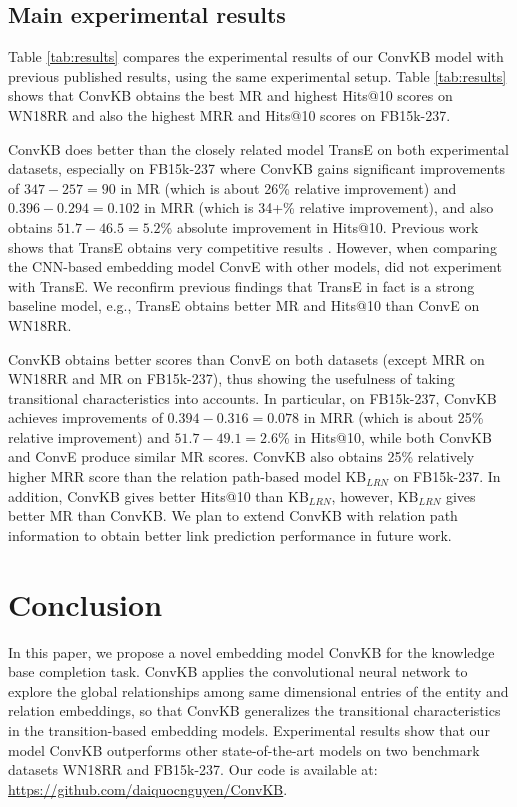 \documentclass[11pt,a4paper]{article}
\begin{document}
\subsection{Main experimental results}
Table \ref{tab:results} compares the experimental results of our ConvKB model with previous published results, using the same experimental setup. Table \ref{tab:results} shows that ConvKB obtains the best MR and highest Hits@10 scores on WN18RR and also the highest MRR and Hits@10 scores on FB15k-237. 

ConvKB does better than the closely related model TransE on both experimental datasets, especially on  FB15k-237 where ConvKB gains significant improvements of $347-257 = 90$ in MR (which is  about 26\% relative improvement) and $0.396 - 0.294 = 0.102$ in MRR (which is   34+\% relative improvement),  and also obtains $51.7 - 46.5 = 5.2$\% absolute   improvement in Hits@10. 
Previous work shows that TransE obtains very competitive results \cite{lin-EtAl:2015:EMNLP1,nickel2016holographic,Trouillon2016,Nguyen2016}. 
However, when comparing  the CNN-based embedding model ConvE  with other models, 
\citet{Dettmers2017} did not experiment with TransE.   
We reconfirm previous findings that TransE in fact is a strong baseline model, e.g., TransE obtains better MR and Hits@10 than ConvE on WN18RR.

ConvKB   obtains  better scores than ConvE on both  datasets (except  MRR  on WN18RR and MR on FB15k-237), thus showing the usefulness of taking transitional characteristics into accounts.  In particular, on   FB15k-237,  ConvKB achieves improvements of $0.394-0.316 = 0.078$ in MRR (which is about 25\% relative improvement) and $51.7 - 49.1 = 2.6$\% in Hits@10, while both ConvKB and ConvE produce similar MR scores.  ConvKB also obtains  25\% relatively higher MRR score than the relation path-based model KB$_{LRN}$ on FB15k-237. In addition, ConvKB  gives better  Hits@10 than KB$_{LRN}$, however, KB$_{LRN}$ gives better MR than ConvKB. We  plan to   extend ConvKB with relation path information to obtain better  link prediction performance  in future work.



\section{Conclusion}
In this paper, we propose a novel embedding model ConvKB for the knowledge base completion task.
ConvKB applies the convolutional neural network to explore the global relationships among same dimensional entries of the entity and relation embeddings, so that ConvKB generalizes the transitional characteristics in the transition-based embedding models.
Experimental results show that our  model ConvKB outperforms other state-of-the-art models on two benchmark datasets WN18RR and FB15k-237.  Our code is available at: \url{https://github.com/daiquocnguyen/ConvKB}.
\end{document}

